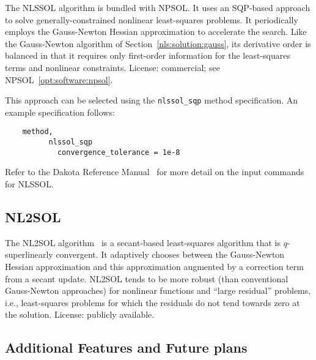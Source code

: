 The NLSSOL algorithm is bundled with NPSOL.  It uses an SQP-based
approach to solve generally-constrained nonlinear least-squares
problems. It periodically employs the Gauss-Newton Hessian
approximation to accelerate the search. Like the Gauss-Newton
algorithm of Section~\ref{nls:solution:gauss}, its derivative order is
balanced in that it requires only first-order information for the
least-squares terms and nonlinear constraints.  License: commercial;
see NPSOL~\ref{opt:software:npsol}.

This approach can be selected using the \texttt{nlssol\_sqp} method
specification. An example specification follows:
\begin{small}
\begin{verbatim}
    method,
          nlssol_sqp
            convergence_tolerance = 1e-8
\end{verbatim}
\end{small}

Refer to the Dakota Reference Manual~\cite{RefMan} for more detail on the
input commands for NLSSOL.

\subsection{NL2SOL}\label{nls:solution:nl2sol}

The NL2SOL algorithm~\cite{Den81} is a secant-based least-squares
algorithm that is $q$-superlinearly convergent.  It adaptively chooses
between the Gauss-Newton Hessian approximation and this approximation
augmented by a correction term from a secant update.  NL2SOL tends to
be more robust (than conventional Gauss-Newton approaches) for
nonlinear functions and ``large residual'' problems, i.e.,
least-squares problems for which the residuals do not tend towards
zero at the solution.  License: publicly available.

\subsection{Additional Features and Future plans}\label{nls:solution:future}

